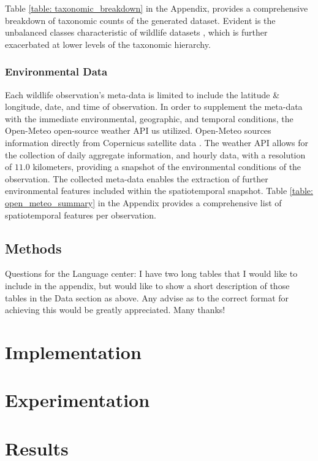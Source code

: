 \documentclass[conference]{IEEEtran}
\begin{document}
        Table \ref{table: taxonomic_breakdown} in the Appendix, provides a comprehensive breakdown of taxonomic counts of the generated dataset. Evident is the unbalanced classes characteristic of wildlife datasets \cite{Van_Horn_Mac_Aodha_Song_Cui_Sun_Shepard_Adam_Perona_Belongie_2018b}, which is further exacerbated at lower levels of the taxonomic hierarchy.

        \subsubsection{Environmental Data}
        Each wildlife observation's meta-data is limited to include the latitude \& longitude, date, and time of observation. In order to supplement the meta-data with the immediate environmental, geographic, and temporal conditions, the Open-Meteo \cite{openmeteo} open-source weather API us utilized. Open-Meteo sources information directly from Copernicus satellite data \cite{era5}. The weather API allows for the collection of daily aggregate information, and hourly data, with a resolution of $11.0$ kilometers, providing a snapshot of the environmental conditions of the observation. The collected meta-data enables the extraction of further environmental features included within the spatiotemporal snapshot. Table \ref{table: open_meteo_summary} in the Appendix provides a comprehensive list of spatiotemporal features per observation.

    
    \subsection{Methods}
    Questions for the Language center:
    I have two long tables that I would like to include in the appendix, but would like to show a short description of those tables in the Data section as above. Any advise as to the correct format for achieving this would be greatly appreciated. Many thanks!

\section{Implementation}

\section{Experimentation}

\section{Results}
\end{document}
